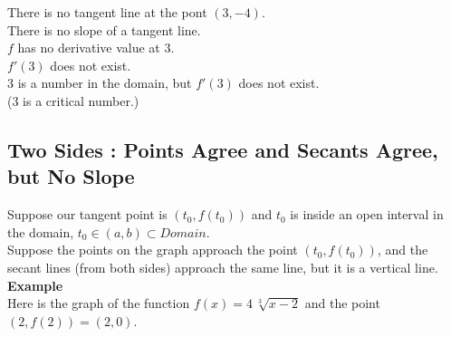 \documentclass{ximera}
\begin{document}
There is no tangent line at the pont $(3,-4)$. \\

There is no slope of a tangent line. \\

$f$ has no derivative value at $3$.  \\

$f'(3)$ does not exist. \\

$3$ is a number in the domain, but $f'(3)$ does not exist. \\

($3$ is a critical number.)

































\subsection*{Two Sides : Points Agree and Secants Agree, but No Slope}


Suppose our tangent point is $(t_0 , f(t_0))$ and $t_0$ is inside an open interval in the domain, $t_0 \in (a, b) \subset Domain$. \\


Suppose the points on the graph approach the point $(t_0 , f(t_0))$, and the secant lines (from both sides) approach the same line, but it is a vertical line. \\



\textbf{\textcolor{blue!55!black}{Example}}  \\




Here is the graph of the function $f(x) = 4 \, \sqrt[3]{x-2}$ and the point $(2, f(2))= (2, 0)$. \\
\end{document}
